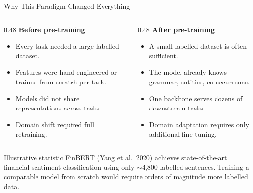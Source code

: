 \documentclass[11pt,aspectratio=169,professionalfonts]{beamer}
\begin{document}
\begin{frame}{Why This Paradigm Changed Everything}
  \begin{columns}[T]
    \begin{column}{0.48\linewidth}
      \textbf{Before pre-training}
      \begin{itemize}
        \item Every task needed a large labelled dataset.
        \item Features were hand-engineered or trained from scratch per task.
        \item Models did not share representations across tasks.
        \item Domain shift required full retraining.
      \end{itemize}
    \end{column}
    \begin{column}{0.48\linewidth}
      \textbf{After pre-training}
      \begin{itemize}
        \item A small labelled dataset is often sufficient.
        \item The model already knows grammar, entities, co-occurrence.
        \item One backbone serves dozens of downstream tasks.
        \item Domain adaptation requires only additional fine-tuning.
      \end{itemize}
    \end{column}
  \end{columns}
  \vspace{0.5em}
  \begin{block}{Illustrative statistic}
    FinBERT (Yang et al.\ 2020) achieves state-of-the-art financial
    sentiment classification using only $\sim$4{,}800 labelled sentences.
    Training a comparable model from scratch would require orders of
    magnitude more labelled data.
  \end{block}
\end{frame}
%
\end{document}
